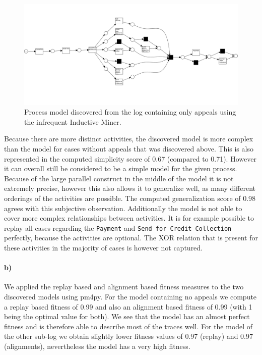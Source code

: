 \documentclass[12pt]{report}
\begin{document}
\begin{figure}[H]
  \centering
  \includegraphics[width=\textwidth]{figures/im_appeals.png}
  \caption{Process model discovered from the log containing only appeals using the infrequent Inductive Miner.}
  \label{fig:im_appeals}
\end{figure}
Because there are more distinct activities, the discovered model is more complex than the model for cases without appeals that was discovered above. This is also represented in the computed simplicity score of 0.67 (compared to 0.71). However it can overall still be considered to be a simple model for the given process. Because of the large parallel construct in the middle of the model it is not extremely precise, however this also allows it to generalize well, as many different orderings of the activities are possible. The computed generalization score of 0.98 agrees with this subjective observation. Additionally the model is not able to cover more complex relationships between activities. It is for example possible to replay all cases regarding the \texttt{Payment} and \texttt{Send for Credit Collection} perfectly, because the activities are optional. The XOR relation that is present for these activities in the majority of cases is however not captured.

\paragraph{\textbf{b)}}
We applied the replay based and alignment based fitness measures to the two discovered models using pm4py. For the model containing no appeals we compute a replay based fitness of 0.99 and also an alignment based fitness of 0.99 (with 1 being the optimal value for both). We see that the model has an almost perfect fitness and is therefore able to describe most of the traces well. For the model of the other sub-log we obtain slightly lower fitness values of 0.97 (replay) and 0.97 (alignments), nevertheless the model has a very high fitness.
\end{document}

